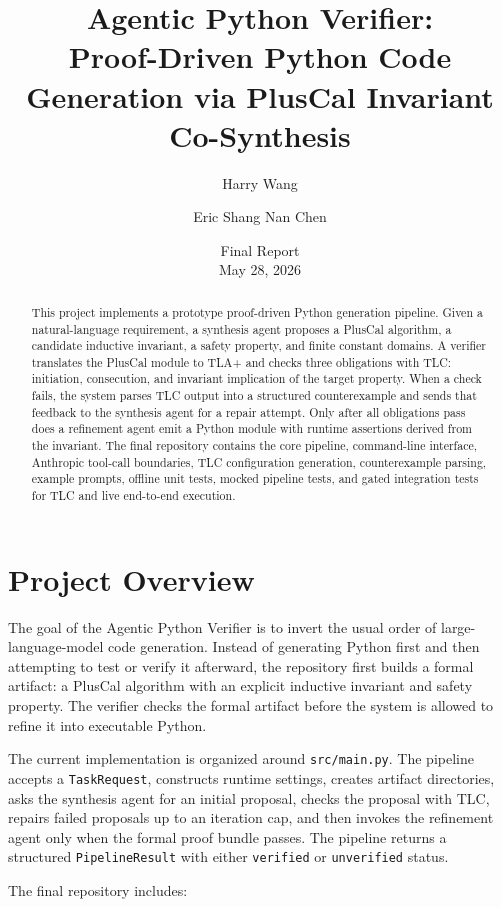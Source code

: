\documentclass[11pt]{article}
\title{Agentic Python Verifier:\\
Proof-Driven Python Code Generation via PlusCal Invariant Co-Synthesis}
\author{Harry Wang \and Eric Shang Nan Chen}
\date{Final Report\\May 28, 2026}
\begin{document}
\maketitle

\begin{abstract}
This project implements a prototype proof-driven Python generation pipeline.
Given a natural-language requirement, a synthesis agent proposes a PlusCal
algorithm, a candidate inductive invariant, a safety property, and finite
constant domains. A verifier translates the PlusCal module to TLA+ and checks
three obligations with TLC: initiation, consecution, and invariant implication
of the target property. When a check fails, the system parses TLC output into a
structured counterexample and sends that feedback to the synthesis agent for a
repair attempt. Only after all obligations pass does a refinement agent emit a
Python module with runtime assertions derived from the invariant. The final
repository contains the core pipeline, command-line interface, Anthropic
tool-call boundaries, TLC configuration generation, counterexample parsing,
example prompts, offline unit tests, mocked pipeline tests, and gated
integration tests for TLC and live end-to-end execution.
\end{abstract}

\section{Project Overview}

The goal of the Agentic Python Verifier is to invert the usual order of
large-language-model code generation. Instead of generating Python first and
then attempting to test or verify it afterward, the repository first builds a
formal artifact: a PlusCal algorithm with an explicit inductive invariant and
safety property. The verifier checks the formal artifact before the system is
allowed to refine it into executable Python.

The current implementation is organized around \texttt{src/main.py}. The
pipeline accepts a \texttt{TaskRequest}, constructs runtime settings, creates
artifact directories, asks the synthesis agent for an initial proposal, checks
the proposal with TLC, repairs failed proposals up to an iteration cap, and
then invokes the refinement agent only when the formal proof bundle passes.
The pipeline returns a structured \texttt{PipelineResult} with either
\texttt{verified} or \texttt{unverified} status.

The final repository includes:
\end{document}

